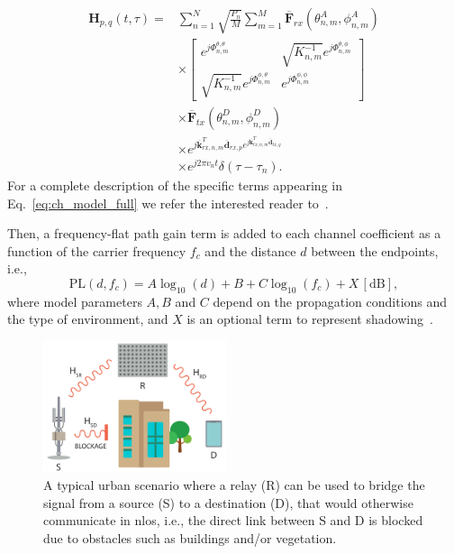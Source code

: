 \begin{equation}
\label{eq:ch_model_full}
\begin{aligned}
\bm{H}_{p, q}(t, \tau)=& \sum_{n=1}^{N} \sqrt{\frac{P_{n}}{M}} \sum_{m=1}^{M} \overline{\mathbf{F}}_{r x}\left(\theta_{n, m}^{A}, \phi_{n, m}^{A}\right) \\
& \times\left[\begin{array}{cr}
e^{j \Phi_{n, m}^{\theta, \theta}} & \sqrt{K_{n, m}^{-1}} e^{j \Phi_{n, m}^{\theta, \phi}} \\
\sqrt{K_{n, m}^{-1}} e^{j \Phi_{n, m}^{\phi, \theta}} & e^{j \Phi_{n, m}^{\phi, \phi}}
\end{array}\right] \\
& \times \overline{\mathbf{F}}_{tx}\left(\theta_{n, m}^{D}, \phi_{n, m}^{D}\right) \\
& \times e^{j \overline{\mathbf{k}}_{rx, n, m}^{T} \overline{\mathbf{d}}_{rx, p} e^{j \overline{\mathbf{k}}_{tx, n, m}^{T} \overline{\mathbf{d}}_{tx, q}}} \\
& \times e^{j 2 \pi v_{n} t} \delta\left(\tau-\tau_{n}\right).
\end{aligned}
\end{equation}
For a complete description of the specific terms appearing in Eq.~\eqref{eq:ch_model_full} we refer the interested reader to~\cite{zugno2020implementation}.

Then, a frequency-flat path gain term is added to each channel coefficient as a function of the carrier frequency $f_c$ and the distance $d$ between the endpoints, i.e.,  %
\begin{equation}
\text{PL} (d, f_c) = A \log_{10} (d) + B + C \log_{10} (f_c) + X \, [\mathrm{dB}],
\label{eq:pl}
\end{equation}
where model parameters $A, B$ and $C$ depend on the propagation conditions and the type of environment, and $X$ is an optional term to represent shadowing~\cite{zugno2020implementation}. 

\begin{figure}[t]
  \centering
    \includegraphics[width=0.48\textwidth]{Figures/IrsSimulation/Scenario_high_level.pdf}
  \caption{A typical urban scenario where a relay (R) can be used to bridge the signal from a source (S) to a destination (D), that would otherwise communicate in \acrshort{nlos}, i.e., the direct link between S and D is blocked due to obstacles such as buildings and/or vegetation.}
  \label{Fig:scenario_high_lvl}
\end{figure}

